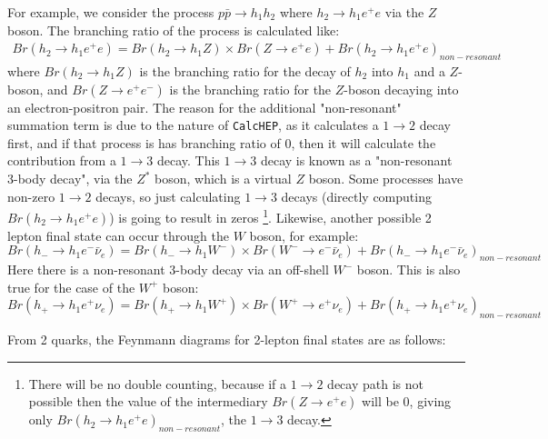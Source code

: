 \documentclass[12pt]{article}
\begin{document}
For example, we consider the process $p\bar{p} \rightarrow h_1h_2$ where $ h_2\rightarrow h_1 e^+e$ via the $Z$ boson. The branching ratio of the process is calculated like:
\begin{equation}
    \begin{split}
        Br(h_2 \rightarrow h_1 e^+e) = Br(h_2\rightarrow h_1Z) \times Br(Z\rightarrow e^+e) + Br(h_2 \rightarrow h_1 e^+e)_{non-resonant}
    \end{split}
\end{equation}
where \( Br(h_2 \rightarrow h_1 Z) \) is the branching ratio for the decay of \( h_2 \) into \( h_1 \) and a \( Z \)-boson, and \( Br(Z \rightarrow e^+ e^-) \) is the branching ratio for the \( Z \)-boson decaying into an electron-positron pair. The reason for the additional "non-resonant" summation term is due to the nature of \verb|CalcHEP|, as it calculates a $1\rightarrow2$ decay first, and if that process is has branching ratio of $0$, then it will calculate the contribution from a $1\rightarrow3$ decay.  This  $1\rightarrow3$ decay is known as a "non-resonant 3-body decay", via the $Z^*$ boson, which is a virtual $Z$ boson. Some processes have non-zero $1\rightarrow2$ decays, so just calculating $1\rightarrow3$ decays (directly computing $Br(h_2 \rightarrow h_1 e^+e)$) is going to result in zeros \footnote{There will be no double counting, because if a $1\rightarrow2$ decay path is not possible then the value of the intermediary $Br(Z\rightarrow e^+e)$ will be $0$, giving only $Br(h_2 \rightarrow h_1 e^+e)_{non-resonant}$, the $1\rightarrow3$ decay.}. Likewise, another possible 2 lepton final state can occur through the $W$ boson, for example:
\begin{equation}
    Br(h_-\rightarrow h_1e^- \bar{\nu}_e) = Br(h_-\rightarrow h_1 W^-) \times Br(W^- \rightarrow e^- \bar{\nu}_e) + Br(h_-\rightarrow h_1e^- \bar{\nu}_e)_{non-resonant}
\end{equation}
Here there is a non-resonant 3-body decay via an off-shell ${W^-}$ boson. This is also true for the case of the $W^+$ boson:
\begin{equation}
    Br(h_+\rightarrow h_1e^+ \nu_e) = Br(h_+\rightarrow h_1 W^+) \times Br(W^+ \rightarrow e^+ \nu_e) + Br(h_+\rightarrow h_1e^+ \nu_e)_{non-resonant}
\end{equation}

From 2 quarks, the Feynmann diagrams for 2-lepton final states are as follows:
 
\end{document}
